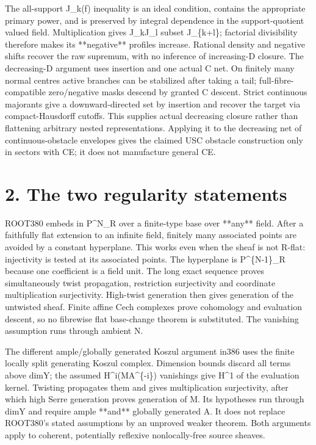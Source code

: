 \documentclass[11pt]{article}
\begin{document}
The all-support J\_k(f) inequality is an ideal condition, contains the appropriate primary power, and is preserved by integral dependence in the support-quotient valued field. Multiplication gives J\_kJ\_l subset J\_\{k+l\}; factorial divisibility therefore makes its **negative** profiles increase. Rational density and negative shifts recover the raw supremum, with no inference of increasing-D closure. The decreasing-D argument uses insertion and one actual C net. On finitely many normal centres active branches can be stabilized after taking a tail; full-fibre-compatible zero/negative masks descend by granted C descent. Strict continuous majorants give a downward-directed set by insertion and recover the target via compact-Hausdorff cutoffs. This supplies actual decreasing closure rather than flattening arbitrary nested representations. Applying it to the decreasing net of continuous-obstacle envelopes gives the claimed USC obstacle construction only in sectors with CE; it does not manufacture general CE.

\section{2. The two regularity statements}

ROOT380 embeds in P\textasciicircum{}N\_R over a finite-type base over **any** field. After a faithfully flat extension to an infinite field, finitely many associated points are avoided by a constant hyperplane. This works even when the sheaf is not R-flat: injectivity is tested at its associated points. The hyperplane is P\textasciicircum{}\{N-1\}\_R because one coefficient is a field unit. The long exact sequence proves simultaneously twist propagation, restriction surjectivity and coordinate multiplication surjectivity. High-twist generation then gives generation of the untwisted sheaf. Finite affine Cech complexes prove cohomology and evaluation descent, so no fibrewise flat base-change theorem is substituted. The vanishing assumption runs through ambient N.

The different ample/globally generated Koszul argument in386 uses the finite locally split generating Koszul complex. Dimension bounds discard all terms above dimY; the assumed H\textasciicircum{}i(MA\textasciicircum{}\{-i\}) vanishings give H\textasciicircum{}1 of the evaluation kernel. Twisting propagates them and gives multiplication surjectivity, after which high Serre generation proves generation of M. Its hypotheses run through dimY and require ample **and** globally generated A. It does not replace ROOT380's stated assumptions by an unproved weaker theorem. Both arguments apply to coherent, potentially reflexive nonlocally-free source sheaves.
\end{document}
